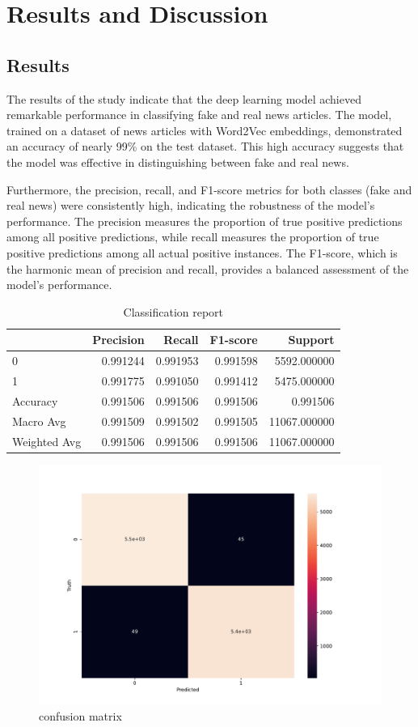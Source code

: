 \chapter{Results and Discussion}
\label{ch:results}



\section{Results}

The results of the study indicate that the deep learning model achieved remarkable performance in classifying fake and real news articles. The model, trained on a dataset of news articles with Word2Vec embeddings, demonstrated an accuracy of nearly 99\% on the test dataset. This high accuracy suggests that the model was effective in distinguishing between fake and real news.

Furthermore, the precision, recall, and F1-score metrics for both classes (fake and real news) were consistently high, indicating the robustness of the model's performance. The precision measures the proportion of true positive predictions among all positive predictions, while recall measures the proportion of true positive predictions among all actual positive instances. The F1-score, which is the harmonic mean of precision and recall, provides a balanced assessment of the model's performance.

\begin{table}[h]
\centering
\caption{Classification report}
\label{tab:classification_report}
\begin{tabular}{lrrrr}
\toprule
& Precision & Recall & F1-score & Support \\
\midrule
0 & 0.991244 & 0.991953 & 0.991598 & 5592.000000 \\
1 & 0.991775 & 0.991050 & 0.991412 & 5475.000000 \\
Accuracy & 0.991506 & 0.991506 & 0.991506 & 0.991506 \\
Macro Avg & 0.991509 & 0.991502 & 0.991505 & 11067.000000 \\
Weighted Avg & 0.991506 & 0.991506 & 0.991506 & 11067.000000 \\
\bottomrule
\end{tabular}
\end{table}

\begin{figure}
    \centering
    \includegraphics[width=0.75\linewidth]{figures/confusion_matrix.pdf}
    \caption{confusion matrix}
    \label{fig:enter-label}
\end{figure}

